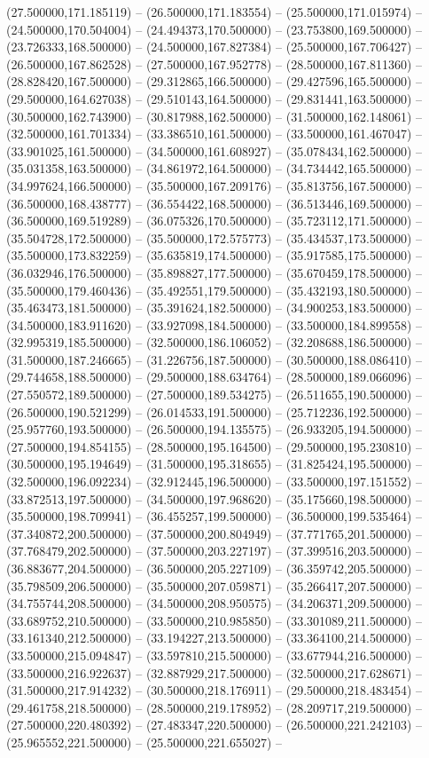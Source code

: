 (27.500000,171.185119) -- (26.500000,171.183554) -- (25.500000,171.015974) -- (24.500000,170.504004) -- (24.494373,170.500000) -- (23.753800,169.500000) -- (23.726333,168.500000) -- (24.500000,167.827384) -- (25.500000,167.706427) -- (26.500000,167.862528) -- (27.500000,167.952778) -- (28.500000,167.811360) -- (28.828420,167.500000) -- (29.312865,166.500000) -- (29.427596,165.500000) -- (29.500000,164.627038) -- (29.510143,164.500000) -- (29.831441,163.500000) -- (30.500000,162.743900) -- (30.817988,162.500000) -- (31.500000,162.148061) -- (32.500000,161.701334) -- (33.386510,161.500000) -- (33.500000,161.467047) -- (33.901025,161.500000) -- (34.500000,161.608927) -- (35.078434,162.500000) -- (35.031358,163.500000) -- (34.861972,164.500000) -- (34.734442,165.500000) -- (34.997624,166.500000) -- (35.500000,167.209176) -- (35.813756,167.500000) -- (36.500000,168.438777) -- (36.554422,168.500000) -- (36.513446,169.500000) -- (36.500000,169.519289) -- (36.075326,170.500000) -- (35.723112,171.500000) -- (35.504728,172.500000) -- (35.500000,172.575773) -- (35.434537,173.500000) -- (35.500000,173.832259) -- (35.635819,174.500000) -- (35.917585,175.500000) -- (36.032946,176.500000) -- (35.898827,177.500000) -- (35.670459,178.500000) -- (35.500000,179.460436) -- (35.492551,179.500000) -- (35.432193,180.500000) -- (35.463473,181.500000) -- (35.391624,182.500000) -- (34.900253,183.500000) -- (34.500000,183.911620) -- (33.927098,184.500000) -- (33.500000,184.899558) -- (32.995319,185.500000) -- (32.500000,186.106052) -- (32.208688,186.500000) -- (31.500000,187.246665) -- (31.226756,187.500000) -- (30.500000,188.086410) -- (29.744658,188.500000) -- (29.500000,188.634764) -- (28.500000,189.066096) -- (27.550572,189.500000) -- (27.500000,189.534275) -- (26.511655,190.500000) -- (26.500000,190.521299) -- (26.014533,191.500000) -- (25.712236,192.500000) -- (25.957760,193.500000) -- (26.500000,194.135575) -- (26.933205,194.500000) -- (27.500000,194.854155) -- (28.500000,195.164500) -- (29.500000,195.230810) -- (30.500000,195.194649) -- (31.500000,195.318655) -- (31.825424,195.500000) -- (32.500000,196.092234) -- (32.912445,196.500000) -- (33.500000,197.151552) -- (33.872513,197.500000) -- (34.500000,197.968620) -- (35.175660,198.500000) -- (35.500000,198.709941) -- (36.455257,199.500000) -- (36.500000,199.535464) -- (37.340872,200.500000) -- (37.500000,200.804949) -- (37.771765,201.500000) -- (37.768479,202.500000) -- (37.500000,203.227197) -- (37.399516,203.500000) -- (36.883677,204.500000) -- (36.500000,205.227109) -- (36.359742,205.500000) -- (35.798509,206.500000) -- (35.500000,207.059871) -- (35.266417,207.500000) -- (34.755744,208.500000) -- (34.500000,208.950575) -- (34.206371,209.500000) -- (33.689752,210.500000) -- (33.500000,210.985850) -- (33.301089,211.500000) -- (33.161340,212.500000) -- (33.194227,213.500000) -- (33.364100,214.500000) -- (33.500000,215.094847) -- (33.597810,215.500000) -- (33.677944,216.500000) -- (33.500000,216.922637) -- (32.887929,217.500000) -- (32.500000,217.628671) -- (31.500000,217.914232) -- (30.500000,218.176911) -- (29.500000,218.483454) -- (29.461758,218.500000) -- (28.500000,219.178952) -- (28.209717,219.500000) -- (27.500000,220.480392) -- (27.483347,220.500000) -- (26.500000,221.242103) -- (25.965552,221.500000) -- (25.500000,221.655027) -- 